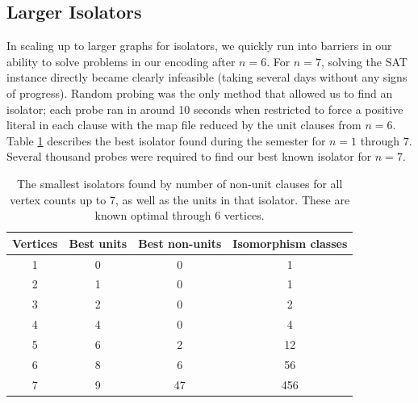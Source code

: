 \documentclass[a4paper,UKenglish,cleveref, autoref, thm-restate]{lipics-v2021}
\begin{document}
\subsection{Larger Isolators}

In scaling up to larger graphs for isolators, we quickly run into barriers in our ability to solve problems in our encoding after $n = 6$.  For $n = 7$, solving the SAT instance directly became clearly infeasible (taking several days without any signs of progress). Random probing was the only method that allowed us to find an isolator; each probe ran in around 10 seconds when restricted to force a positive literal in each clause with the map file reduced by the unit clauses from $n=6$.  Table \ref{tab:smallest_isolators_found} describes the best isolator found during the semester for $n = 1$ through $7$. Several thousand probes were required to find our best known isolator for $n=7$.

\begin{table}[ht]
    \centering
    \begin{tabular}{c|c|c|c}
        Vertices &Best units & Best non-units & Isomorphism classes \\ \hline
        1&0&0&1\\ 
        2&1&0&1\\ 
        3&2&0&2\\ 
        4&4&0&4\\
        5&6&2&12\\ 
        6&8&6&56\\ 
        7&9&47&456\\ 
    \end{tabular}
    \caption{The smallest isolators found by number of non-unit clauses for all vertex counts up to 7, as well as the units in that isolator.  These are known optimal through 6 vertices.}
    \label{tab:smallest_isolators_found}
\end{table}
\end{document}
